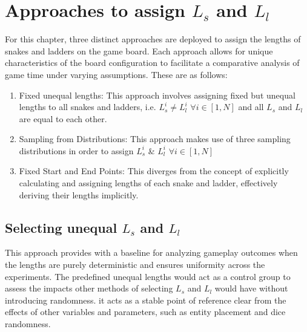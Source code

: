 \documentclass[12pt]{report}
\begin{document}
	\section{Approaches to assign $L_s$ and $L_l$}
	For this chapter, three distinct approaches are deployed to assign the lengths of snakes and ladders on the game board. Each approach allows for unique characteristics of the board configuration to facilitate a comparative analysis of game time under varying assumptions. These are as follows:
	\begin{enumerate}
		\item Fixed unequal lengths: This approach involves assigning fixed but unequal lengths to all snakes and ladders, i.e. $L^i_s \neq  L^i_l$ \space $ \forall i \in [1, N]$ and all $L_s$  and $L_l$ are equal to each other.
		\item Sampling from Distributions: This approach makes use of three sampling distributions in order to assign $L^i_s$ \&  $L^i_l$ \space $\forall i \in [1, N]$
		\item Fixed Start and End Points: This diverges from the concept of explicitly calculating and assigning lengths of each snake and ladder, effectively deriving their lengths implicitly.
	\end{enumerate}
	
	\subsection{Selecting unequal $L_s$ and $L_l$}
	This approach provides with a baseline for analyzing gameplay outcomes when the lengths are purely deterministic and ensures uniformity across the experiments. The predefined unequal lengths would act as a control group to assess the impacts other methods of selecting $L_s$ and $L_l$ would have without introducing randomness. it acts as a stable point of reference clear from the effects of other variables and parameters, such as entity placement and dice randomness.
	
\end{document}
